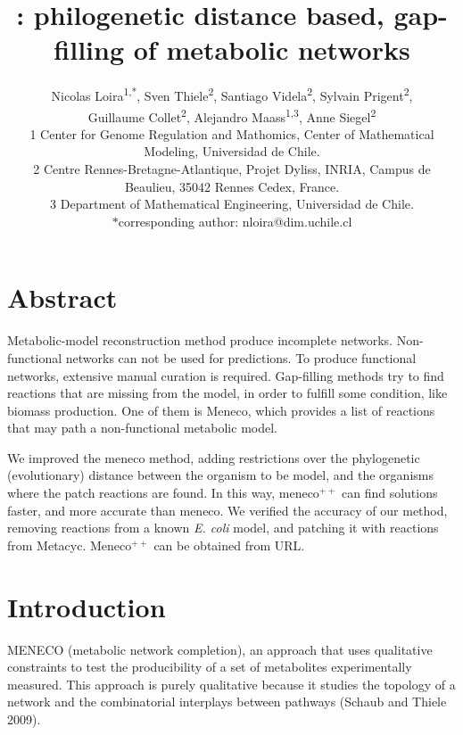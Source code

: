 \documentclass{article}
\title{\Meneco: philogenetic distance based, gap-filling of metabolic networks}
\author{Nicolas Loira\textsuperscript{1,*},
Sven Thiele\textsuperscript{2},
Santiago Videla\textsuperscript{2},
Sylvain Prigent\textsuperscript{2},\\
Guillaume Collet\textsuperscript{2},
Alejandro Maass\textsuperscript{1,3},
Anne Siegel\textsuperscript{2}\\
{\scriptsize 1 Center for Genome Regulation and Mathomics, Center of Mathematical Modeling, Universidad de Chile.}\\
{\scriptsize 2 Centre Rennes-Bretagne-Atlantique, Projet Dyliss, INRIA, Campus de Beaulieu, 35042 Rennes Cedex, France.}\\
{\scriptsize 3 Department of Mathematical Engineering, Universidad de Chile.} \\
{\scriptsize $*$corresponding author: nloira@dim.uchile.cl}
}
\newcommand{\Meneco}{Meneco$^{++}$\xspace}
\newcommand{\meneco}{meneco$^{++}$\xspace}
\begin{document}
\maketitle

\section{Abstract}

	Metabolic-model reconstruction method produce incomplete networks. Non-functional networks can not be used for predictions. To produce functional networks, extensive manual curation is required.
	Gap-filling methods try to find reactions that are missing from the model, in order to fulfill some condition, like biomass production. One of them is Meneco, which provides a list of reactions that may path a non-functional metabolic model.


	We improved the meneco method, adding restrictions over the phylogenetic (evolutionary) distance between the organism to be model, and the organisms where the patch reactions are found. In this way, \meneco can find solutions faster, and more accurate than meneco.
	We verified the accuracy of our method, removing reactions from a known \emph{E. coli} model, and patching it with reactions from Metacyc. \Meneco can be obtained from URL.



\section{Introduction}

MENECO (metabolic network completion), an approach that uses qualitative constraints to test the producibility of a set of metabolites experimentally measured.
This approach is purely qualitative because it studies the topology of a network and the combinatorial interplays between pathways (Schaub and Thiele 2009).
\end{document}
